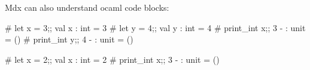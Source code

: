 Mdx can also understand ocaml code blocks:


\begin{ocaml}
# let x = 3;;
val x : int = 3
# let y = 4;;
val y : int = 4
# print_int x;;
3
- : unit = ()
# print_int y;;
4
- : unit = ()
\end{ocaml}

\begin{ocaml}
\end{ocaml}

\begin{ocaml}
\end{ocaml}

\begin{ocaml}
\end{ocaml}

\begin{ocaml}
\end{ocaml}

\begin{ocaml}
# let x = 2;;
val x : int = 2
# print_int x;;
3
- : unit = ()
\end{ocaml}
